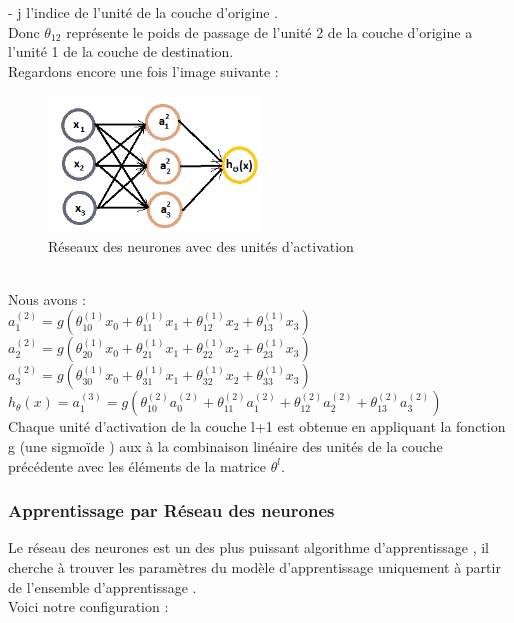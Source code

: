  - j l'indice de l'unité de la couche d'origine .\\
  Donc ${\theta}_{12}$ représente le poids de passage de l'unité 2 de la couche d'origine a l'unité 1 de la couche de destination.\\
 Regardons encore une fois l'image suivante :
\begin{figure}[ht]
 	\centering
 	\includegraphics[width=0.5\textwidth]{fig/NeuralNtwork2.png}
 	\caption[Short caption]{Réseaux des neurones avec des unités d'activation }
 	\label{fig:image12}
\end{figure}\\
 Nous avons : \\
 ${a}_{1}^{(2) }= g({\theta}_{10}^{(1)}{x}_{0} + {\theta}_{11}^{(1)}{x}_{1} + {\theta}_{12}^{(1)}{x}_{2} + {\theta}_{13}^{(1)}{x}_{3})$ \\
 ${a}_{2}^{(2) }= g({\theta}_{20}^{(1)}{x}_{0} + {\theta}_{21}^{(1)}{x}_{1} + {\theta}_{22}^{(1)}{x}_{2} + {\theta}_{23}^{(1)}{x}_{3})$ \\
 ${a}_{3}^{(2) }= g({\theta}_{30}^{(1)}{x}_{0} + {\theta}_{31}^{(1)}{x}_{1} + {\theta}_{32}^{(1)}{x}_{2} + {\theta}_{33}^{(1)}{x}_{3})$ \\
 ${h}_{\theta}(x) ={a}_{1}^{(3) }= g({\theta}_{10}^{(2)}{a}_{0}^{(2)} + {\theta}_{11}^{(2)}{a}_{1}^{(2)} + {\theta}_{12}^{(2)}{a}_{2}^{(2)} + {\theta}_{13}^{(2)}{a}_{3}^{(2)})$ \\
 
 Chaque unité d'activation de la couche l+1 est obtenue en appliquant la fonction g (une sigmoïde ) aux à la combinaison linéaire des unités de la couche précédente avec les éléments de la matrice ${\theta}^{l}$. \\
 \subsubsection{Apprentissage par Réseau des neurones }
 Le réseau des neurones est un des plus puissant algorithme d'apprentissage ,
 il cherche à trouver les paramètres du modèle d'apprentissage uniquement à partir de l'ensemble d'apprentissage .\\
 Voici notre configuration :
 
